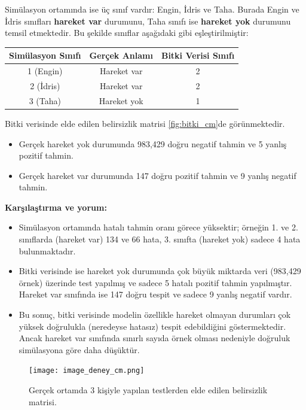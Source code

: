 Simülasyon ortamında ise üç sınıf vardır: Engin, İdris ve Taha. Burada Engin ve İdris sınıfları \textbf{hareket var} durumunu, Taha sınıfı ise \textbf{hareket yok} durumunu temsil etmektedir. Bu şekilde sınıflar aşağıdaki gibi eşleştirilmiştir:
\begin{center}
\begin{tabular}{ccc}
\toprule
\textbf{Simülasyon Sınıfı} & \textbf{Gerçek Anlamı} & \textbf{Bitki Verisi Sınıfı} \\
\midrule
1 (Engin) & Hareket var & 2 \\
2 (İdris) & Hareket var & 2 \\
3 (Taha) & Hareket yok & 1 \\
\bottomrule
\end{tabular}
\end{center}



Bitki verisinde elde edilen belirsizlik matrisi \ref{fig:bitki_cm}de görünmektedir.
\begin{itemize}
    \item Gerçek hareket yok durumunda 983,429 doğru negatif tahmin ve 5 yanlış pozitif tahmin.
    \item Gerçek hareket var durumunda 147 doğru pozitif tahmin ve 9 yanlış negatif tahmin.
\end{itemize}


\textbf{Karşılaştırma ve yorum:}
\begin{itemize}
    \item Simülasyon ortamında hatalı tahmin oranı görece yüksektir; örneğin 1. ve 2. sınıflarda (hareket var) 134 ve 66 hata, 3. sınıfta (hareket yok) sadece 4 hata bulunmaktadır.
    \item Bitki verisinde ise hareket yok durumunda çok büyük miktarda veri (983,429 örnek) üzerinde test yapılmış ve sadece 5 hatalı pozitif tahmin yapılmıştır. Hareket var sınıfında ise 147 doğru tespit ve sadece 9 yanlış negatif vardır.
    \item Bu sonuç, bitki verisinde modelin özellikle hareket olmayan durumları çok yüksek doğrulukla (neredeyse hatasız) tespit edebildiğini göstermektedir. Ancak hareket var sınıfında sınırlı sayıda örnek olması nedeniyle doğruluk simülasyona göre daha düşüktür.
\end{itemize}

\begin{figure}[H]
    \centering
    \texttt{[image: image\_deney\_cm.png]}
    \caption{Gerçek ortamda 3 kişiyle yapılan testlerden elde edilen belirsizlik matrisi.}
    \label{fig:deney_cm}
\end{figure}


